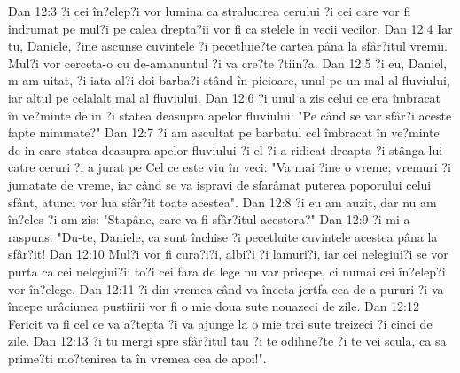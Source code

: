 Dan 12:3  ?i cei în?elep?i vor lumina ca stralucirea cerului ?i cei care vor fi îndrumat pe mul?i pe calea drepta?ii vor fi ca stelele în vecii vecilor.
Dan 12:4  Iar tu, Daniele, ?ine ascunse cuvintele ?i pecetluie?te cartea pâna la sfâr?itul vremii. Mul?i vor cerceta-o cu de-amanuntul ?i va cre?te ?tiin?a.
Dan 12:5  ?i eu, Daniel, m-am uitat, ?i iata al?i doi barba?i stând în picioare, unul pe un mal al fluviului, iar altul pe celalalt mal al fluviului.
Dan 12:6  ?i unul a zis celui ce era îmbracat în ve?minte de in ?i statea deasupra apelor fluviului: "Pe când se var sfâr?i aceste fapte minunate?"
Dan 12:7  ?i am ascultat pe barbatul cel îmbracat în ve?minte de in care statea deasupra apelor fluviului ?i el ?i-a ridicat dreapta ?i stânga lui catre ceruri ?i a jurat pe Cel ce este viu în veci: "Va mai ?ine o vreme; vremuri ?i jumatate de vreme, iar când se va ispravi de sfarâmat puterea poporului celui sfânt, atunci vor lua sfâr?it toate acestea".
Dan 12:8  ?i eu am auzit, dar nu am în?eles ?i am zis: "Stapâne, care va fi sfâr?itul acestora?"
Dan 12:9  ?i mi-a raspuns: "Du-te, Daniele, ca sunt închise ?i pecetluite cuvintele acestea pâna la sfâr?it!
Dan 12:10  Mul?i vor fi cura?i?i, albi?i ?i lamuri?i, iar cei nelegiui?i se vor purta ca cei nelegiui?i; to?i cei fara de lege nu var pricepe, ci numai cei în?elep?i vor în?elege.
Dan 12:11  ?i din vremea când va înceta jertfa cea de-a pururi ?i va începe urâciunea pustiirii vor fi o mie doua sute nouazeci de zile.
Dan 12:12  Fericit va fi cel ce va a?tepta ?i va ajunge la o mie trei sute treizeci ?i cinci de zile.
Dan 12:13  ?i tu mergi spre sfâr?itul tau ?i te odihne?te ?i te vei scula, ca sa prime?ti mo?tenirea ta în vremea cea de apoi!".


